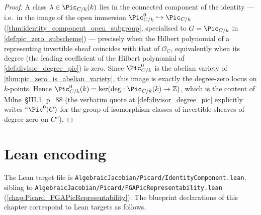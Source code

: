 \begin{proof}
  A class
  \(\lambda \in \Pic_{C/k}(k)\) lies in the connected component of
  the identity --- i.e.\ in the image of the open immersion
  \(\Pic^0_{C/k} \hookrightarrow \Pic_{C/k}\)
  (\cref{thm:identity_component_open_subgroup}, specialised to
  \(G = \Pic_{C/k}\) in \cref{def:pic_zero_subscheme}) --- precisely when
  the Hilbert polynomial of a representing invertible sheaf coincides
  with that of \(\mathcal{O}_C\), equivalently when its degree (the
  leading coefficient of the Hilbert polynomial of
  \cref{def:divisor_degree_pic}) is zero. Since \(\Pic^0_{C/k}\) is the
  abelian variety of \cref{thm:pic_zero_is_abelian_variety}, this image
  is exactly the degree-zero locus on \(k\)-points. Hence
  \(\Pic^0_{C/k}(k) = \ker(\deg : \Pic_{C/k}(k) \to \mathbb{Z})\),
  which is the content of Milne~\S III.1, p.~88 (the verbatim quote
  at \cref{def:divisor_degree_pic} explicitly writes ``\(\Pic^0(C)\)
  for the group of isomorphism classes of invertible sheaves of degree
  zero on \(C\)'').
\end{proof}

\section{Lean encoding}
\label{sec:pic0_lean_encoding}

The Lean target file is
\texttt{AlgebraicJacobian/Picard/IdentityComponent.lean}, sibling to
\texttt{AlgebraicJacobian/Picard/FGAPicRepresentability.lean}
(\cref{chap:Picard_FGAPicRepresentability}). The blueprint declarations
of this chapter correspond to Lean targets as follows.


